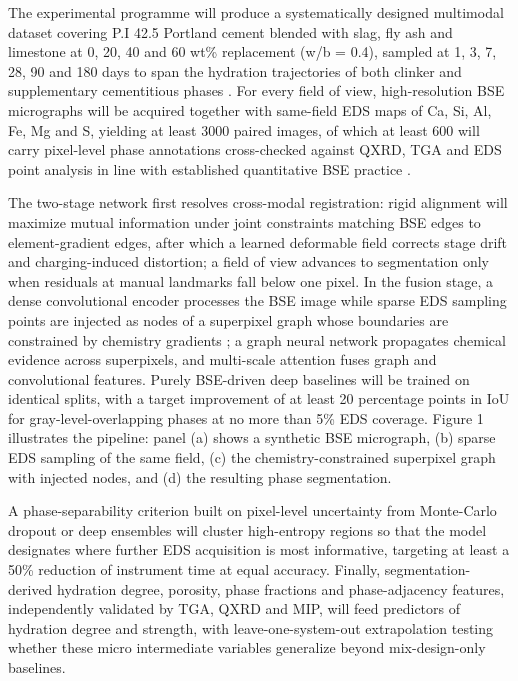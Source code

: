 \documentclass[11pt,a4paper]{article}
\begin{document}
The experimental programme will produce a systematically designed multimodal dataset covering P.I 42.5 Portland cement blended with slag, fly ash and limestone at 0, 20, 40 and 60 wt\% replacement (w/b = 0.4), sampled at 1, 3, 7, 28, 90 and 180 days to span the hydration trajectories of both clinker and supplementary cementitious phases \citep{lothenbach2011,juenger2015}. For every field of view, high-resolution BSE micrographs will be acquired together with same-field EDS maps of Ca, Si, Al, Fe, Mg and S, yielding at least 3000 paired images, of which at least 600 will carry pixel-level phase annotations cross-checked against QXRD, TGA and EDS point analysis in line with established quantitative BSE practice \citep{scrivener2004}.

The two-stage network first resolves cross-modal registration: rigid alignment will maximize mutual information \citep{maes1997} under joint constraints matching BSE edges to element-gradient edges, after which a learned deformable field corrects stage drift and charging-induced distortion; a field of view advances to segmentation only when residuals at manual landmarks fall below one pixel. In the fusion stage, a dense convolutional encoder processes the BSE image while sparse EDS sampling points are injected as nodes of a superpixel graph whose boundaries are constrained by chemistry gradients \citep{achanta2012}; a graph neural network propagates chemical evidence across superpixels, and multi-scale attention fuses graph and convolutional features. Purely BSE-driven deep baselines \citep{ronneberger2015,long2015} will be trained on identical splits, with a target improvement of at least 20 percentage points in IoU for gray-level-overlapping phases at no more than 5\% EDS coverage. Figure 1 illustrates the pipeline: panel (a) shows a synthetic BSE micrograph, (b) sparse EDS sampling of the same field, (c) the chemistry-constrained superpixel graph with injected nodes, and (d) the resulting phase segmentation.

A phase-separability criterion built on pixel-level uncertainty from Monte-Carlo dropout or deep ensembles will cluster high-entropy regions so that the model designates where further EDS acquisition is most informative, targeting at least a 50\% reduction of instrument time at equal accuracy. Finally, segmentation-derived hydration degree, porosity, phase fractions and phase-adjacency features, independently validated by TGA, QXRD and MIP, will feed predictors of hydration degree and strength, with leave-one-system-out extrapolation testing whether these micro intermediate variables generalize beyond mix-design-only baselines.
\end{document}
